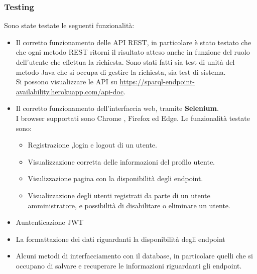 \documentclass[8pt]{beamer}
\begin{document}
\begin{frame}[allowframebreaks]
    \frametitle{Testing}
    Sono state testate le seguenti funzionalità:
    \begin{itemize}
        \item Il corretto funzionamento delle API REST, in particolare è stato testato
              che che ogni metodo REST ritorni il risultato atteso anche in funzione del ruolo dell'utente che effettua la richiesta.
              Sono stati fatti sia test di unità del metodo Java che si occupa di gestire la richiesta, sia test di sistema.\\
              Si possono visualizzare le API su \url{https://sparql-endpoint-availability.herokuapp.com/api-doc}.
        \item Il corretto funzionamento dell'interfaccia web, tramite \textbf{Selenium}.\\
              I browser supportati sono Chrome , Firefox ed Edge.
              Le funzionalità testate sono:
              \begin{itemize}
                  \item Registrazione ,login e logout di un utente.
                  \item Visualizzazione corretta delle informazioni del profilo utente.
                  \item Visulizzazione pagina con la disponibilità degli endpoint.
                  \item Visualizzazione degli utenti registrati da parte di un utente amministratore, e possibilità di disabilitare o eliminare un utente.
              \end{itemize}
        \item Auntenticazione JWT
        \item La formattazione dei dati riguardanti la disponibilità degli endpoint
        \item Alcuni metodi di interfacciamento con il database, in particolare quelli che si occupano di salvare e recuperare le informazioni riguardanti gli endpoint.
    \end{itemize}
\end{frame}
\end{document}
